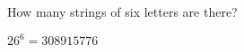 \documentclass[../main.tex]{subfiles}
\begin{document}
How many strings of six letters are there?

\solution
$26^6 = 308915776$
\end{document}
